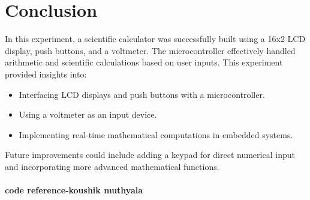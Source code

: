 \documentclass[a4paper,12pt]{article}
\begin{document}
\section{Conclusion}

In this experiment, a scientific calculator was successfully built using a {16x2 LCD display}, {push buttons}, and a {voltmeter}. The microcontroller effectively handled arithmetic and scientific calculations based on user inputs. This experiment provided insights into:
\begin{itemize}
    \item Interfacing {LCD displays} and {push buttons} with a microcontroller.
    \item Using a {voltmeter} as an input device.
    \item Implementing real-time {mathematical computations} in embedded systems.
\end{itemize}

Future improvements could include adding a {keypad} for direct numerical input and incorporating more advanced mathematical functions.\
\ \\ \\
\textbf{code reference-{koushik muthyala}}
\end{document}
